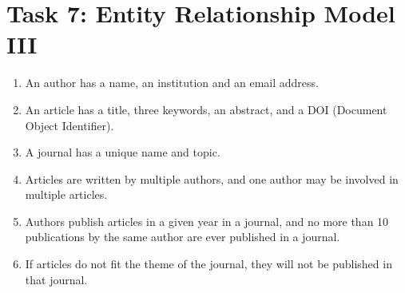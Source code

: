 \documentclass{article}
\begin{document}
\newpage
\section*{Task 7: Entity Relationship Model III}
\begin{enumerate}
\item An author has a name, an institution and an email address.

\item An article has a title, three keywords, an abstract, and a DOI (Document Object Identifier).

\item A journal has a unique name and topic.

\item Articles are written by multiple authors, and one author may be involved in multiple articles.

\item Authors publish articles in a given year in a journal, and no more than 10 publications by
the same author are ever published in a journal.

\item If articles do not fit the theme of the journal, they will not be published in that journal.
\end{enumerate}


\newpage
\printbibliography
\end{document}
